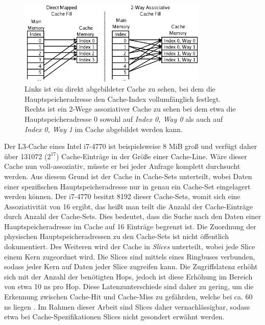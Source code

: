 \begin{figure}[h]
\label{fig:CacheAsso}
\caption{Links ist ein direkt abgebildeter Cache zu sehen, bei dem die Hauptspeicheradresse den Cache-Index vollumfänglich festlegt. Rechts ist ein 2-Wege assoziativer Cache zu sehen bei dem etwa die Hauptspeicheradresse 0 sowohl auf \textit{Index 0, Way 0} als auch auf \textit{Index 0, Way 1} im Cache abgebildet werden kann.}
\centering
\includegraphics[width=0.8\textwidth]{basics/Cache_Asso.png}
\end{figure}

Der L3-Cache eines Intel i7-4770 ist beispielsweise 8 MiB groß und verfügt daher über 131072 ($2^{17}$) Cache-Einträge in der Größe einer Cache-Line. 
Wäre dieser Cache nun voll-assoziativ, müsste er bei jeder Anfrage komplett durchsucht werden. Aus diesem Grund ist der Cache in Cache-Sets unterteilt, wobei Daten einer spezifischen Hauptspeicheradresse nur in genau ein Cache-Set eingelagert werden können. 
Der i7-4770 besitzt 8192 dieser Cache-Sets, womit sich eine Assoziativität von 16 ergibt, das heißt man teilt die Anzahl der Cache-Einträge durch Anzahl der Cache-Sets. Dies bedeutet, dass die Suche nach den Daten einer Hauptspeicheradresse im Cache auf 16 Einträge begrenzt ist. 
Die Zuordnung der physischen Hauptspeicheradressen zu den Cache-Sets ist nicht öffentlich dokumentiert.
Des Weiteren wird der Cache in \textit{Slices} unterteilt, wobei jede Slice einem Kern zugeordnet wird. Die Slices sind mittels eines Ringbuses verbunden, sodass jeder Kern auf Daten jeder Slice zugreifen kann. Die Zugriffslatenz erhöht sich mit der Anzahl der benötigten Hops, jedoch ist diese Erhöhung im Bereich von etwa 10 ns pro Hop. Diese Latenzunterschiede sind daher zu gering, um die Erkennung zwischen Cache-Hit und Cache-Miss zu gefährden, welche bei ca. 60 ns liegen \cite{TheSpyInTheSandbox}. Im Rahmen dieser Arbeit sind Slices daher vernachlässigbar, sodass etwa bei Cache-Spezifikationen Slices nicht gesondert erwähnt werden.

